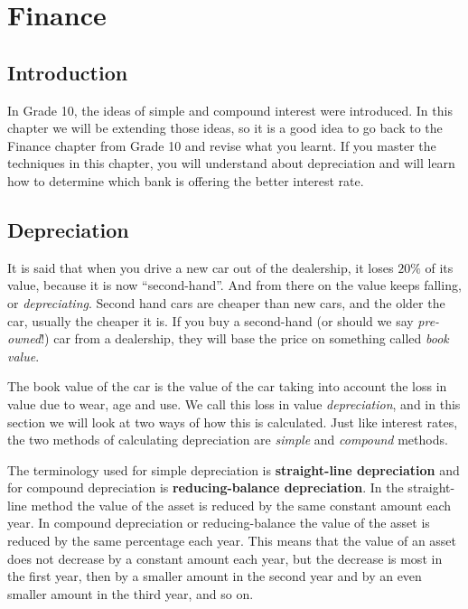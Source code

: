 \chapter{Finance}
\label{m:f11}

\section{Introduction}
In Grade 10, the ideas of simple and compound interest were introduced. In this chapter we will be extending those ideas, so it is a good idea to go back to the Finance chapter from Grade 10 and revise what you learnt. If you master the techniques in this chapter, you will understand about depreciation and will learn how to determine which bank is offering the better interest rate.


\section{Depreciation}

It is said that when you drive a new car out of the dealership, it loses $20\%$ of its value, because it is now ``second-hand''. And from there on the value keeps falling, or \textit{depreciating}. Second hand cars are cheaper than new cars, and the older the car, usually the cheaper it is. If you buy a second-hand (or should we say \textit{pre-owned}!) car from a dealership, they will base the price on something called \textit{book value}.

The book value of the car is the value of the car taking into account the loss in value due to wear, age and use. We call this loss in value \textit{depreciation}, and in this section we will look at two ways of how this is calculated. Just like interest rates, the two methods of calculating depreciation are \textit{simple} and \textit{compound} methods.

The terminology used for simple depreciation is \textbf{straight-line depreciation} and for compound depreciation is \textbf{reducing-balance depreciation}.  In the straight-line method the value of the asset is reduced by the same constant amount each year. In compound depreciation or reducing-balance the value of the asset is reduced by the same percentage each year. This means that the value of an asset does not decrease by a constant amount each year, but the decrease is most in the first year, then by a smaller amount in the second year and by an even smaller amount in the third year, and so on.

